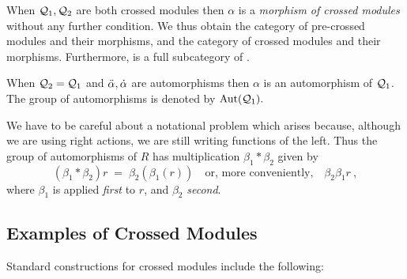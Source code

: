When  $\mathcal{Q}_1, \mathcal{Q}_2$  are both crossed modules then  $\alpha$
is a \emph{morphism of crossed modules} 
without any further condition.
We thus obtain the category
\catPreXMod of pre-crossed modules and their morphisms,
and the category \catXMod of crossed modules and their morphisms.
Furthermore, \catXMod is a full subcategory of \catPreXMod.

When $\mathcal{Q}_2 = \mathcal{Q}_1$
and $ \ddot{\alpha}, \dot{\alpha} $ are automorphisms then 
$\alpha$  is an automorphism of $\mathcal{Q}_1$. 
The group of automorphisms is denoted 
by $\rm{Aut}(\mathcal{Q}_1).$ 

We have to be careful about a notational problem 
which arises because, although we are using right actions,
we are still writing functions of the left.
Thus the group of automorphisms of $R$ has multiplication
$\beta_1 * \beta_2$  given by
$$ 
(\beta_1 * \beta_2)r \;=\; \beta_2(\beta_1(r))
\quad \mbox{or, more conveniently,} \quad
\beta_2 \beta_1 r~,
$$ 
where $\beta_1$ is applied \emph{first} to $r$, 
and $\beta_2$ \emph{second}.



\subsection{Examples of Crossed Modules}

Standard constructions for crossed modules include the following:

